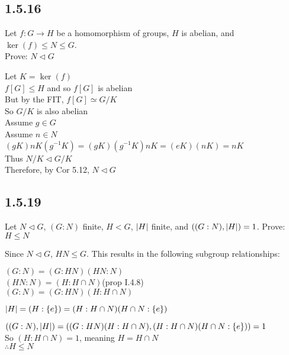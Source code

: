 \documentclass[letterpaper,12pt,fleqn]{article}
\newcommand{\n}{\mathrel{\triangleleft}}
\begin{document}
\subsection*{1.5.16}

Let $f:G\to H$ be a homomorphism of groups, $H$ is abelian, and
$\ker(f)\le N\le G$. \\
Prove: $N\n G$

Let $K=\ker(f)$ \\
$f[G]\le H$ and so $f[G]$ is abelian \\
But by the FIT, $f[G]\simeq G/K$ \\
So $G/K$ is also abelian \\
Assume $g\in G$ \\
Assume $n\in N$ \\
$(gK)nK(g^{-1}K)=(gK)(g^{-1}K)nK=(eK)(nK)=nK$ \\
Thus $N/K\n G/K$ \\
Therefore, by Cor 5.12, $N\n G$

\subsection*{1.5.19}

Let $N\n G$, $(G:N)$ finite, $H<G$, $\lvert H\rvert$ finite, and $((G:N),\lvert H\rvert)=1$.
Prove: $H\le N$

Since $N\n G$, $HN\le G$. This results in the following subgroup relationships:


$(G:N)=(G:HN)(HN:N)$ \\
$(HN:N)=(H:H\cap N)$\hspace{0.25in}(prop I.4.8) \\
$(G:N)=(G:HN)(H:H\cap N)$

$\lvert H\rvert=(H:\{e\})=(H:H\cap N)(H\cap N:\{e\})$

$((G:N),\lvert H\rvert)=((G:HN)(H:H\cap N),(H:H\cap N)(H\cap N:\{e\}))=1$ \\
So $(H:H\cap N)=1$, meaning $H=H\cap N$ \\
$\therefore H\le N$
\end{document}
